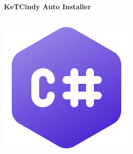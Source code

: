 \documentclass[dvipdfmx, unicode]{beamer}
\begin{document}
\begin{frame}[t]{\bfseries KeTCindy Auto Installer}
  \begin{columns}[T]
    \begin{column}{0.4\linewidth}
      \includegraphics[width=1.0\linewidth]{img/AutoInstaller/C_Sharp_Icon.png}
    \end{column}
    \begin{column}{0.4\linewidth}

\end{column}
\end{columns}
\end{frame}
\end{document}
